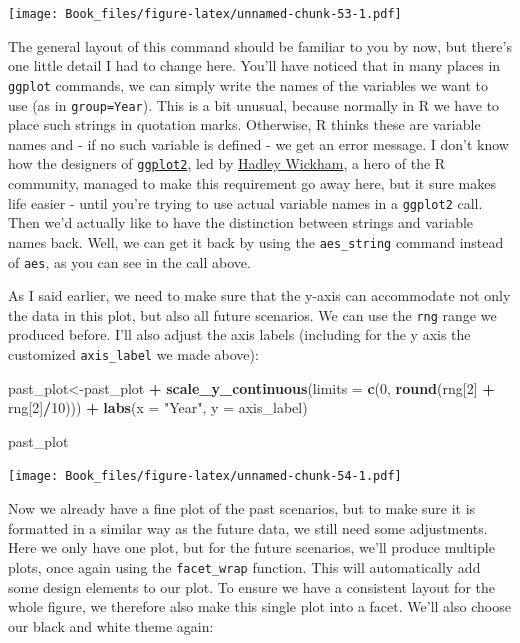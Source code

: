 \documentclass[
]{book}
\newenvironment{Shaded}{\begin{snugshade}}{\end{snugshade}}
\newcommand{\DataTypeTok}[1]{\textcolor[rgb]{0.13,0.29,0.53}{#1}}
\newcommand{\DecValTok}[1]{\textcolor[rgb]{0.00,0.00,0.81}{#1}}
\newcommand{\KeywordTok}[1]{\textcolor[rgb]{0.13,0.29,0.53}{\textbf{#1}}}
\newcommand{\NormalTok}[1]{#1}
\newcommand{\OperatorTok}[1]{\textcolor[rgb]{0.81,0.36,0.00}{\textbf{#1}}}
\newcommand{\StringTok}[1]{\textcolor[rgb]{0.31,0.60,0.02}{#1}}
\begin{document}
\texttt{[image: Book\_files/figure-latex/unnamed-chunk-53-1.pdf]}

The general layout of this command should be familiar to you by now, but there's one little detail I had to change here. You'll have noticed that in many places in \texttt{ggplot} commands, we can simply write the names of the variables we want to use (as in \texttt{group=Year}). This is a bit unusual, because normally in R we have to place such strings in quotation marks. Otherwise, R thinks these are variable names and - if no such variable is defined - we get an error message. I don't know how the designers of \href{https://cran.r-project.org/web/packages/ggplot2/ggplot2.pdf}{\texttt{ggplot2}}, led by \href{https://scholar.google.de/citations?hl=en\&user=YA43PbsAAAAJ}{Hadley Wickham}, a hero of the R community, managed to make this requirement go away here, but it sure makes life easier - until you're trying to use actual variable names in a \texttt{ggplot2} call. Then we'd actually like to have the distinction between strings and variable names back. Well, we can get it back by using the \texttt{aes\_string} command instead of \texttt{aes}, as you can see in the call above.

As I said earlier, we need to make sure that the y-axis can accommodate not only the data in this plot, but also all future scenarios. We can use the \texttt{rng} range we produced before. I'll also adjust the axis labels (including for the y axis the customized \texttt{axis\_label} we made above):

\begin{Shaded}
\begin{Highlighting}[]
\NormalTok{past_plot<-past_plot }\OperatorTok{+}
\StringTok{  }\KeywordTok{scale_y_continuous}\NormalTok{(}\DataTypeTok{limits =} \KeywordTok{c}\NormalTok{(}\DecValTok{0}\NormalTok{, }\KeywordTok{round}\NormalTok{(rng[}\DecValTok{2}\NormalTok{] }\OperatorTok{+}\StringTok{ }\NormalTok{rng[}\DecValTok{2}\NormalTok{]}\OperatorTok{/}\DecValTok{10}\NormalTok{))) }\OperatorTok{+}
\StringTok{  }\KeywordTok{labs}\NormalTok{(}\DataTypeTok{x =} \StringTok{"Year"}\NormalTok{, }\DataTypeTok{y =}\NormalTok{ axis_label)}

\NormalTok{past_plot}
\end{Highlighting}
\end{Shaded}

\texttt{[image: Book\_files/figure-latex/unnamed-chunk-54-1.pdf]}

Now we already have a fine plot of the past scenarios, but to make sure it is formatted in a similar way as the future data, we still need some adjustments. Here we only have one plot, but for the future scenarios, we'll produce multiple plots, once again using the \texttt{facet\_wrap} function. This will automatically add some design elements to our plot. To ensure we have a consistent layout for the whole figure, we therefore also make this single plot into a facet. We'll also choose our black and white theme again:
\end{document}

